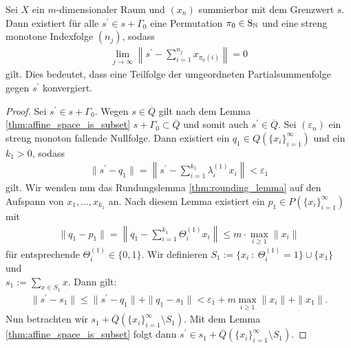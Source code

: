 \newpage
\begin{lem}\label{th:lemma_apply_rounding_of_lemma_steinitz_finite_dimensional}
	Sei $ X $ ein $ m $-dimensionaler Raum und $ (x_n) $ summierbar mit dem Grenzwert $ s $. 
	Dann existiert für alle $ s^\prime  \in s + \Gamma_0 $ eine Permutation $ \pi_0 \in \mathrm{S}_{\mathbb{N}} $ und eine streng monotone Indexfolge $ (n_j) $, sodass
	\begin{align}
	\lim \limits_{j \to \infty}
	\left\| s^\prime - \sum \limits_{i = 1}^{n_j} x_{\pi_0(i)} 
	\right\| = 0
	\end{align}
	gilt.
	Dies bedeutet, dass eine Teilfolge der umgeordneten Partialsummenfolge gegen $ s^\prime $ konvergiert. 
\end{lem}
\begin{proof}
	Sei $ s^\prime \in s + \Gamma_0 $.
	Wegen $ s \in \overline{Q} $ gilt nach dem Lemma \ref{thm:affine_space_is_subset}
	$ s + \Gamma_0 \subset \overline{Q} $ und somit auch $ s^\prime \in \overline{Q} $.
	Sei $ (\varepsilon_n) $ ein streng monoton fallende Nullfolge.
	Dann existiert ein $ q_1 \in Q(\{x_i\}_{i =1}^\infty) $ und ein $ k_1 > 0 $, sodass
	\begin{align*}
		\| s^\prime - q_1 \| 
		=
		\left\|
		s^\prime - \sum \limits_{i = 1}^{k_1} \lambda_i^{(1)} x_i
		\right\|
		< \varepsilon_1
	\end{align*}
	gilt. Wir wenden nun das Rundungslemma \ref{thm:rounding_lemma} auf den Aufspann von $ x_1,...,x_{k_1} $ an. Nach diesem Lemma existiert ein $ p_1 \in P(\{x_i\}_{i =1}^\infty) $ mit
	\begin{align*}
		\| q_1 - p_1 \| = \left\| q_1 - \sum \limits_{i = 1}^{k_1} \Theta_i^{(1)} x_i \right\| \leq m \cdot \max \limits_{i \geq 1} \|x_i \|
	\end{align*}
	für entsprechende $ \Theta_i^{(1)} \in \{0,1\} $.
	Wir definieren $ S_1 := \{x_i \ : \ \Theta_i^{(1)} = 1\} \cup \{x_1\} $ und \\ $ s_1 := \sum_{x \in S_1} x $.
	Dann gilt:
	\begin{align*}
		\|s^\prime - s_1 \| 
		\leq
		\| s^\prime  -q_1 \| + \| q_1 - s_1\|
		< 
		\varepsilon_1 + m \max_{i \geq 1} \| x_i \| + \| x_1\|.
	\end{align*}
	Nun betrachten wir  $ s_1 + \overline{Q}(\{x_i\}_{i = 1}^\infty \setminus S_1) $. Mit dem Lemma \ref{thm:affine_space_is_subset} folgt dann $ s^\prime \in s_1 + \overline{Q}(\{x_i\}_{i = 1}^\infty \setminus S_1) $.

\end{proof}
